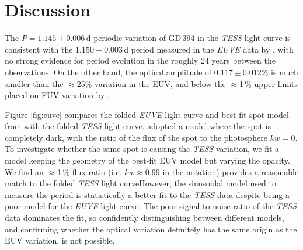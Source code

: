\documentclass{aastex63}
\begin{document}

\section{Discussion} \label{sec:disc}

The  $P = 1.145\pm 0.006$\,d periodic variation of GD\,394 in the {\em TESS} light curve is consistent with the $ 1.150\pm0.003$\,d period measured in the {\em EUVE} data by \citet{dupuisetal00-1}, with no strong evidence for period evolution in the roughly 24 years between the observations. On the other hand, the optical amplitude of $0.117\pm0.012$\% is much smaller than the $\approx$25\% variation in the EUV, and below the $\approx$1\,\% upper limits placed on FUV variation by \citet{wilsonetal19-1}.

Figure \ref{fig:euve} compares the folded \textit{EUVE} light curve and best-fit spot model from \citet{dupuisetal00-1} with the folded \textit{TESS} light curve. \citet{dupuisetal00-1} adopted a model where the spot is completely dark, with the ratio of the flux of the spot to the photosphere $kw =0$. To investigate whether the same spot is causing the \textit{TESS} variation, we fit a model keeping the geometry of the best-fit EUV model but varying the opacity. We find an $\approx$1\,\% flux ratio (i.e. $kw\approx0.99$ in the \citet{dupuisetal00-1} notation) provides a reasonable match to the folded \textit{TESS} light curveHowever, the sinusoidal model used to measure the period is statistically a better fit to the \textit{TESS} data despite being a poor model for the \textit{EUVE} light curve. The poor signal-to-noise ratio of the \textit{TESS} data dominates the fit, so confidently distinguishing between different models, and confirming whether the optical variation definitely has the same origin as the EUV variation, is not possible.




\end{document}
